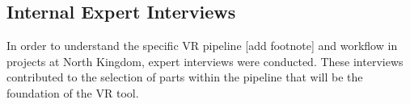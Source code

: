 \subsection{Internal Expert Interviews}
In order to understand the specific VR pipeline [add footnote] and workflow in projects at North Kingdom, expert interviews were conducted. These interviews contributed to the selection of parts within the pipeline that will be the foundation of the VR tool.
